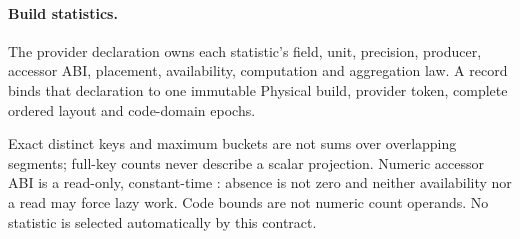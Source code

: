 \paragraph{Build statistics.}
The provider declaration owns each statistic's field, unit, precision,
producer, accessor ABI, placement, availability, computation and aggregation
law. A  record binds that declaration to one immutable
Physical build, provider token, complete ordered layout and code-domain epochs.
\begin{mathpar}
\end{mathpar}
Exact distinct keys and maximum buckets are not sums over overlapping
segments; full-key counts never describe a scalar projection. Numeric accessor
ABI is a read-only, constant-time : absence is not zero
and neither availability nor a read may force lazy work. Code bounds are not
numeric count operands. No statistic is selected automatically by this contract.

